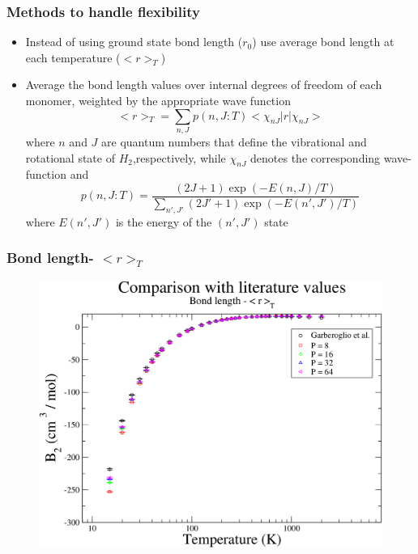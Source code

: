 \documentclass[xcolor=svgnames]{beamer}
\begin{document}
	\begin{frame}
	\frametitle{Methods to handle flexibility}
	\begin{itemize}
	\justifying
	\item Instead of using ground state bond length ($r_0$) use average bond length at each temperature ($< r >_T$)
	\item Average the bond length values over internal degrees of freedom of each monomer, weighted by the appropriate wave function
	\begin{equation*}
	<r>_T = \displaystyle\sum\limits_{n,J} p(n,J:T) < \chi_{nJ} | r | \chi_{nJ} >
	\end{equation*}
	\noindent where $n$ and $J$ are quantum numbers that define the vibrational and rotational state of $H_2$,respectively, while $\chi_{nJ}$ denotes the corresponding wave-function and \\
	\begin{equation*}
	p(n,J:T) = \frac{(2J + 1) \exp(-E(n,J)/T)}{\displaystyle\sum\limits_{n',J'} (2J' + 1) \exp(-E(n',J')/T)}
	\end{equation*}
	\noindent where $E(n',J')$ is the energy of the $(n',J')$ state
	\end{itemize}
	\end{frame}

	\begin{frame}
	\frametitle{Bond length- $< r >_T$}
	\begin{figure}
	\centering
	\includegraphics[scale=0.18,keepaspectratio]{8sfTAResults.png}
	\end{figure}
	
	\end{frame}
\end{document}
